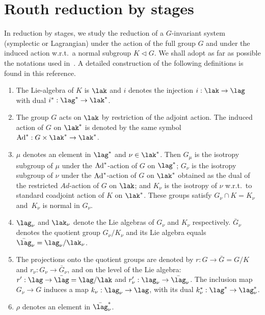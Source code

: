 \section{Routh reduction by stages}\label{section6}
In reduction by stages, we study the reduction of a $G$-invariant system (symplectic or Lagrangian) under the action of the full group $G$ and under the induced action w.r.t.\ a normal subgroup $K\lhd G$. We shall adopt as far as possible the notations used in~\cite{MarsdenHamRed}. A detailed construction of the following def\/initions is found in this reference.
\begin{definition}\mbox{} \label{def:notations}
\begin{enumerate}\itemsep=0pt
\item The Lie-algebra of $K$ is $\lak$ and $i$ denotes the injection $i: \lak\to \lag$ with dual $i^*: \lag^*\to \lak^*$.
\item The group $G$ acts on $\lak$ by restriction of the adjoint action. The induced action of $G$ on $\lak^*$ is denoted by the same symbol ${\rm Ad}^*:G\times\lak^*\to \lak^*$.
\item  $\mu$ denotes an element in $\lag^*$ and $\nu\in\lak^*$. Then $G_\mu$ is the isotropy subgroup of $\mu$ under the ${\rm Ad}^*$-action of $G$ on $\lag^*$; $G_\nu$ is the isotropy subgroup of $\nu$ under the ${\rm Ad}^*$-action of $G$ on $\lak^*$ obtained as the dual of the restricted $Ad$-action of $G$ on $\lak$; and $K_\nu$ is the isotropy of $\nu$ w.r.t.\ to standard coadjoint action of $K$ on $\lak^*$. These groups satisfy $G_\nu\cap K= K_\nu$ and~$K_\nu$ is normal in $G_\nu$.
\item $\lag_\nu$ and $\lak_\nu$ denote the Lie algebras of $G_\nu$ and $K_\nu$ respectively. $\bar G_\nu$ denotes the quotient group $G_\nu/K_\nu$ and its Lie algebra equals $\bar\lag_\nu= \lag_\nu/\lak_\nu$.
\item The projections onto the quotient groups are denoted by $r: G\to \bar G=G/K$ and $r_\nu:G_\nu\to\bar G_\nu$, and on the level of the Lie algebra: $r': \lag \to \bar \lag =\lag/\lak$ and $r'_\nu:\lag_\nu \to \bar\lag_\nu$.   The inclusion map $G_\nu \to G$ induces a map $k_\nu: \lag_\nu \to \lag$, with its dual $k_\nu^*: \lag^*\to \lag_\nu^*$.
\item $\rho$ denotes an element in $\bar\lag_\nu^*$.
\end{enumerate}
\end{definition}

